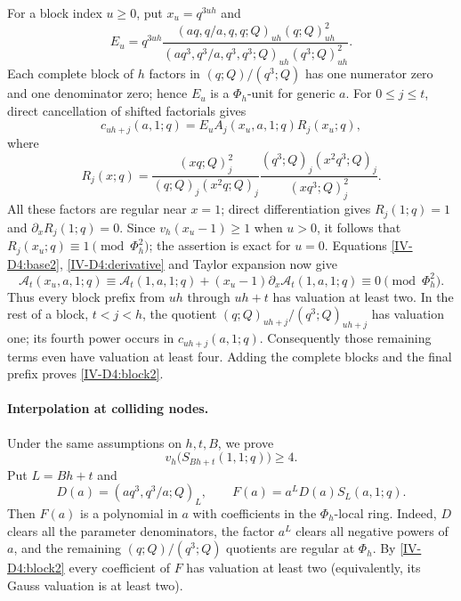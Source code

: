 \documentclass[11pt,letterpaper]{article}
\numberwithin{equation}{section}
\begin{document}
For a block index $u\ge0$, put $x_u=q^{3uh}$ and
\[
 E_u=q^{3uh}
 \frac{(aq,q/a,q,q;Q)_{uh}(q;Q)_{uh}^{2}}
 {(aq^3,q^3/a,q^3,q^3;Q)_{uh}(q^3;Q)_{uh}^{2}}.
\]
Each complete block of $h$ factors in $(q;Q)/(q^3;Q)$ has one
numerator zero and one denominator zero; hence $E_u$ is a
$\Phi_h$-unit for generic $a$.  For $0\le j\le t$, direct
cancellation of shifted factorials gives
\[
 c_{uh+j}(a,1;q)=E_u A_j(x_u,a,1;q)R_j(x_u;q),
\]
where
\[
 R_j(x;q)=\frac{(xq;Q)_j^2}{(q;Q)_j(x^2q;Q)_j}
          \frac{(q^3;Q)_j(x^2q^3;Q)_j}{(xq^3;Q)_j^2}.
\]
All these factors are regular near $x=1$; direct differentiation
gives $R_j(1;q)=1$ and $\partial_xR_j(1;q)=0$.
Since $v_h(x_u-1)\ge1$ when $u>0$, it follows that
$R_j(x_u;q)\equiv1\pmod{\Phi_h^2}$; the assertion is exact
for $u=0$.  Equations \eqref{IV-D4:base2}, \eqref{IV-D4:derivative}
and Taylor expansion now give
\[
 \mathcal A_t(x_u,a,1;q)\equiv
 \mathcal A_t(1,a,1;q)+(x_u-1)\partial_x \mathcal A_t(1,a,1;q)
 \equiv0\pmod{\Phi_h^2}.
\]
Thus every block prefix from $uh$ through $uh+t$ has valuation
at least two.  In the rest of a block, $t<j<h$, the quotient
$(q;Q)_{uh+j}/(q^3;Q)_{uh+j}$ has valuation one; its fourth
power occurs in $c_{uh+j}(a,1;q)$.  Consequently those remaining
terms even have valuation at least four.  Adding the complete
blocks and the final prefix proves \eqref{IV-D4:block2}.

\paragraph{Interpolation at colliding nodes.}
Under the same assumptions on $h,t,B$, we prove
\begin{equation}\label{IV-D4:four}
 v_h\bigl(S_{Bh+t}(1,1;q)\bigr)\ge4.
\end{equation}
Put $L=Bh+t$ and
\[
 D(a)=(aq^3,q^3/a;Q)_L,\qquad
 F(a)=a^L D(a)S_L(a,1;q).
\]
Then $F(a)$ is a polynomial in $a$ with coefficients in the
$\Phi_h$-local ring.  Indeed, $D$ clears all the parameter
denominators, the factor $a^L$ clears all negative powers of $a$,
and the remaining $(q;Q)/(q^3;Q)$ quotients are regular at
$\Phi_h$.  By \eqref{IV-D4:block2} every coefficient of $F$ has
valuation at least two (equivalently, its Gauss valuation is
at least two).
\end{document}
